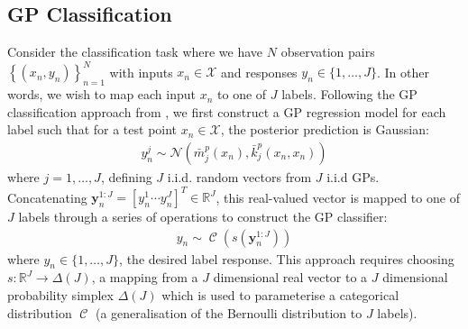 \documentclass{article}
\newcommand{\Cat}{\operatorname{\mathcal{C}}}
\numberwithin{equation}{section}
\begin{document}
\subsection{GP Classification}
Consider the classification task where we have $N$ observation pairs $\left\{(x_n, y_n)\right\}_{n=1}^{N}$ with inputs $x_n \in \mathcal{X}$ and responses $y_n \in \{1, \dots, J\}$. In other words, we wish to map each input $x_n$ to one of $J$ labels. Following the GP classification approach from \cite{matthews2017scalable}, we first construct a GP regression model for each label such that for a test point $x_n \in \mathcal{X}$, the posterior prediction is Gaussian:
\begin{align}
    y_n^j \sim \mathcal{N}\left(\bar{m}^p_j(x_n), \bar{k}^p_j(x_n, x_n)\right)
    \label{gp-classifier-regressors}
\end{align}
where $j=1, \dots, J$, defining $J$ i.i.d. random vectors from $J$ i.i.d GPs.
Concatenating $\mathbf{y}_n^{1:J} = [y_n^1 \cdots y_n^J]^T \in \mathbb{R}^{J}$, this real-valued vector is mapped to one of $J$ labels through a series of operations to construct the GP classifier:
\begin{align}
y_n \sim \Cat \left(s\left(\mathbf{y}_n^{1:J}\right)\right)
\label{gp-classifier}
\end{align}
where $y_n \in \{1, \dots, J\}$, the desired label response. This approach requires choosing $s: \mathbb{R}^J \rightarrow \Delta(J)$, a mapping from a $J$ dimensional real vector to a $J$ dimensional probability simplex $\Delta(J)$ which is used to parameterise a categorical distribution $\Cat$ (a generalisation of the Bernoulli distribution to $J$ labels).
\end{document}
